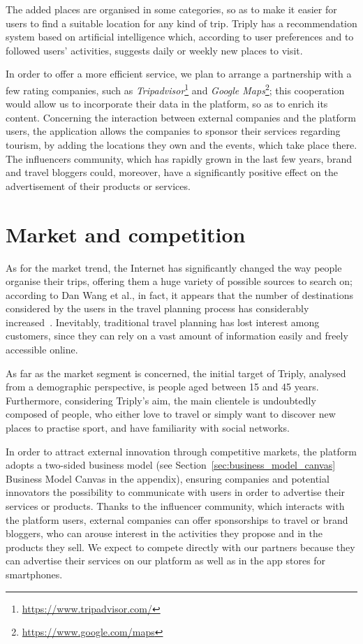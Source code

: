 \documentclass[letterpaper, 11pt]{Proposal}
\def\Sec#1{Section~\ref{#1}}
\begin{document}
The added places are organised in some categories, so as to make it easier for users to find a suitable location for any kind of trip. Triply has a recommendation system based on artificial intelligence which, according to user preferences and to followed users' activities, suggests daily or weekly new places to visit.

In order to offer a more efficient service, we plan to arrange a partnership with a few rating companies, such as \emph{Tripadvisor}\footnote{\url{https://www.tripadvisor.com/}} and \emph{Google Maps}\footnote{\url{https://www.google.com/maps}}; this cooperation would allow us to incorporate their data in the platform, so as to enrich its content. Concerning the interaction between external companies and the platform users, the application allows the companies to sponsor their services regarding tourism, by adding the locations they own and the events, which take place there. The influencers community, which has rapidly grown in the last few years, brand and travel bloggers could, moreover, have a significantly positive effect on the advertisement of their products or services.

\section{Market and competition}\label{sec:mrkt-comp}
As for the market trend, the Internet has significantly changed the way people organise their trips, offering them a huge variety of possible sources to search on; according to Dan Wang et al., in fact, it appears that the number of destinations considered by the users in the travel planning process has considerably increased~\cite{travel_impact:2016}. Inevitably, traditional travel planning has lost interest among customers, since they can rely on a vast amount of information easily and freely accessible online.

As far as the market segment is concerned, the initial target of Triply, analysed from a demographic perspective, is people aged between 15 and 45 years. Furthermore, considering Triply's aim, the main clientele is undoubtedly composed of people, who either love to travel or simply want to discover new places to practise sport, and have familiarity with social networks.

In order to attract external innovation through competitive markets, the platform adopts a two-sided business model (see \Sec{sec:business_model_canvas} Business Model Canvas in the appendix), ensuring companies and potential innovators the possibility to communicate with users in order to advertise their services or products. Thanks to the influencer community, which interacts with the platform users, external companies can offer sponsorships to travel or brand bloggers, who can arouse interest in the activities they propose and in the products they sell. We expect to compete directly with our partners because they can advertise their services on our platform as well as in the app stores for smartphones.
\end{document}
